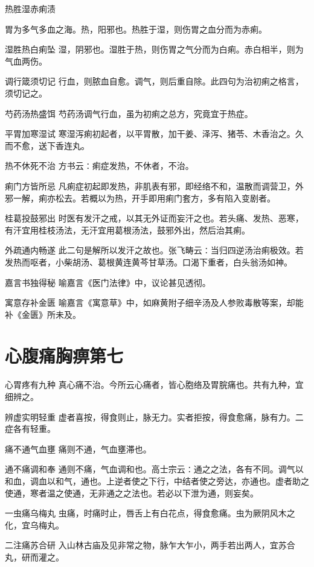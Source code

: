 \documentclass[a4paper,12pt,UTF8,twoside]{ctexbook}
\begin{document}
  热胜湿赤痢渍
  
  胃为多气多血之海。热，阳邪也。热胜于湿，则伤胃之血分而为赤痢。
    
  湿胜热白痢坠
  湿，阴邪也。湿胜于热，则伤胃之气分而为白痢。赤白相半，则为气血两伤。
    
  调行箴须切记
  行血，则脓血自愈。调气，则后重自除。此四句为治初痢之格言，须切记之。
    
  芍药汤热盛饵
  芍药汤调气行血，虽为初痢之总方，究竟宜于热症。
    
  平胃加寒湿试
  寒湿泻痢初起者，以平胃散，加干姜、泽泻、猪苓、木香治之。久而不愈，送下香连丸。
    
  热不休死不治
  方书云∶痢症发热，不休者，不治。
    
  痢门方皆所忌
  凡痢症初起即发热，非肌表有邪，即经络不和，温散而调营卫，外邪一解，痢亦松去。若概以为热，开手即用痢门套方，多有陷入变剧者。
    
  桂葛投鼓邪出
  时医有发汗之戒，以其无外证而妄汗之也。若头痛、发热、恶寒，有汗宜用桂枝汤法，无汗宜用葛根汤法，鼓邪外出，然后治其痢。
    
  外疏通内畅遂
  此二句是解所以发汗之故也。张飞畴云∶当归四逆汤治痢极效。若发热而呕者，小柴胡汤、葛根黄连黄芩甘草汤。口渴下重者，白头翁汤如神。
    
  嘉言书独得秘
  喻嘉言《医门法律》中，议论甚见透彻。
    
  寓意存补金匮
  喻嘉言《寓意草》中，如麻黄附子细辛汤及人参败毒散等案，却能补《金匮》所未及。
    
  \chapter{心腹痛胸痹第七}
  心胃疼有九种
  真心痛不治。今所云心痛者，皆心胞络及胃脘痛也。共有九种，宜细辨之。
    
  辨虚实明轻重
  虚者喜按，得食则止，脉无力。实者拒按，得食愈痛，脉有力。二症各有轻重。
    
  痛不通气血壅
  痛则不通，气血壅滞也。
    
  通不痛调和奉
  通则不痛，气血调和也。高士宗云∶通之之法，各有不同。调气以和血，调血以和气，通也。上逆者使之下行，中结者使之旁达，亦通也。虚者助之使通，寒者温之使通，无非通之之法也。若必以下泄为通，则妄矣。
    
  一虫痛乌梅丸
  虫痛，时痛时止，唇舌上有白花点，得食愈痛。虫为厥阴风木之化，宜乌梅丸。
    
  二注痛苏合研
  入山林古庙及见非常之物，脉乍大乍小，两手若出两人，宜苏合丸，研而灌之。
    
\end{document}
